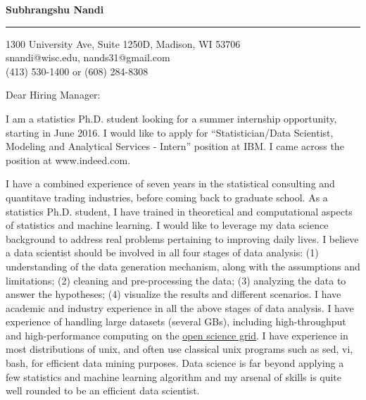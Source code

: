\documentclass{letter} %
\begin{document}
\begin{letter}
\begin{flushleft}
{\bf Subhrangshu Nandi}
\end{flushleft}
\medskip\hrule height 1pt
\begin{flushright}
\hfill 1300 University Ave, Suite 1250D, Madison, WI 53706 \\
\hfill snandi@wisc.edu, nands31@gmail.com\\
\hfill (413) 530-1400 or (608) 284-8308
\end{flushright} 
\vfill %

\opening{Dear Hiring Manager:} 
 
\noindent %
I am a statistics Ph.D. student looking for a summer internship opportunity, starting in June 2016. I would like to apply for ``Statistician/Data Scientist, Modeling and Analytical Services - Intern'' position at IBM. I came across the position at www.indeed.com.
 
\noindent %
I have a combined experience of seven years in the statistical consulting and quantitave trading industries, before coming back to graduate school. As a statistics Ph.D. student, I have trained in theoretical and computational aspects of statistics and machine learning. I would like to leverage my data science background to address real problems pertaining to improving daily lives. I believe a data scientist should be involved in all four stages of data analysis: (1) understanding of the data generation mechanism, along with the assumptions and limitations; (2) cleaning and pre-processing the data; (3) analyzing the data to answer the hypotheses; (4) visualize the results and different scenarios. I have academic and industry experience in all the above stages of data analysis. I have experience of handling large datasets (several GBs), including high-throughput and high-performance computing on the \href{http://www.opensciencegrid.org/}{open science grid}. I have experience in most distributions of unix, and often use classical unix programs such as sed, vi, bash, for efficient data mining purposes. Data science is far beyond applying a few statistics and machine learning algorithm and my arsenal of skills is quite well rounded to be an efficient data scientist. 


\end{letter}
\end{document}
